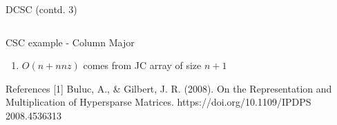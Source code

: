 \documentclass[12pt, usenames, dvipsnames]{beamer}
\begin{document}
\begin{frame}[fragile]{DCSC (contd. 3)}
\begin{columns}
\begin{column}{0.5\textwidth}
\begin{center}
\end{center}
	
\end{column}
\end{columns}
\end{frame}

\begin{frame}[fragile]{CSC example - Column Major}
	\begin{enumerate}
		\item $O(n + nnz)$ comes from JC array of size $n+1$
	\end{enumerate}
\end{frame}

\begin{frame}{References}
	[1] Buluc, A., \& Gilbert, J. R. (2008). On the Representation and Multiplication of Hypersparse Matrices. https://doi.org/10.1109/IPDPS 2008.4536313
\end{frame}
\end{document}
